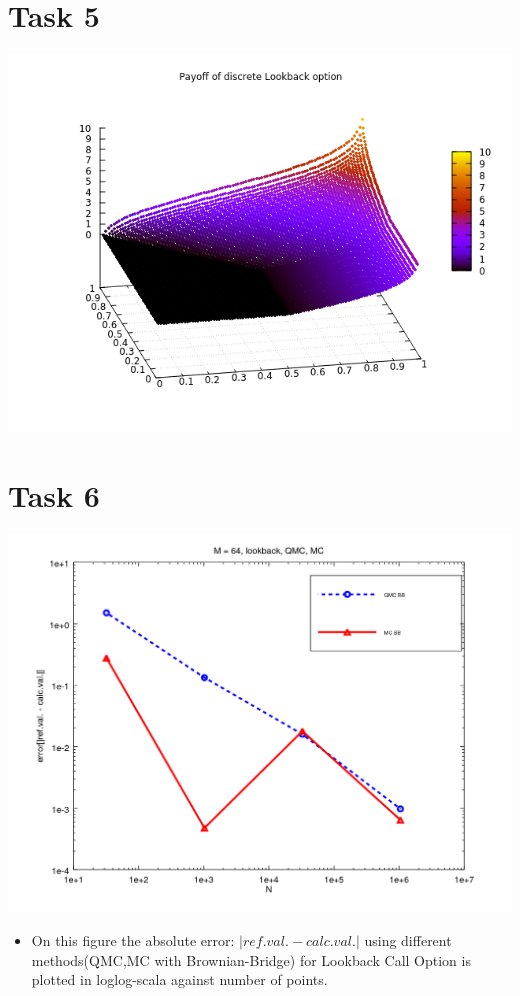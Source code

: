 \documentclass[10pt,a4paper]{article}
\begin{document}
\section*{Task 5}

\begin{center}
	\includegraphics[scale=0.4]{images/payoff_lookback.png}
\end{center}

\section*{Task 6}

\begin{center}
	\includegraphics[scale=0.3]{images/task6_error.png}
\end{center}
\begin{itemize}
    \item{
        On this figure the absolute error: $|ref.val.-calc.val.|$ using different methods(QMC,MC with Brownian-Bridge) for Lookback Call Option is plotted in loglog-scala against number of points.
        
    }
     
\end{itemize}
\end{document}
